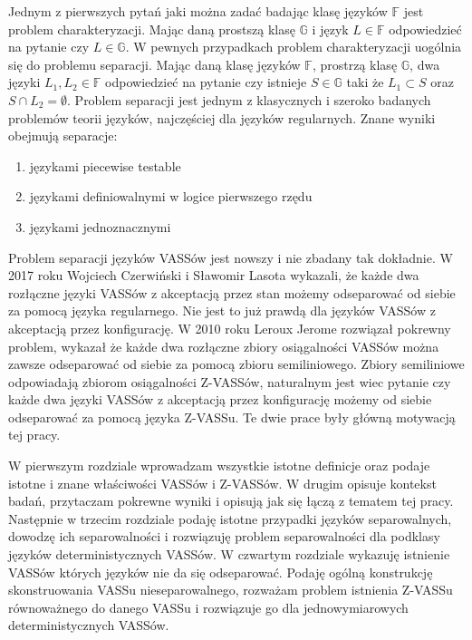     Jednym z pierwszych pytań jaki można zadać badając klasę języków $\mathbb{F}$ jest problem charakteryzacji.
    Mając daną prostszą klasę $\mathbb{G}$ i język $L\in \mathbb{F}$ odpowiedzieć na pytanie czy $L \in \mathbb{G}$.
    W pewnych przypadkach problem charakteryzacji uogólnia się do problemu separacji.
    Mając daną klasę języków $\mathbb{F}$, prostrzą klasę $\mathbb{G}$, dwa języki $L_1,L_2 \in \mathbb{F}$ odpowiedzieć na
    pytanie czy istnieje $S \in \mathbb{G}$ taki że $L_1 \subset S$ oraz $S \cap L_2 = \emptyset$.
    Problem separacji jest jednym z klasycznych i szeroko badanych problemów teorii języków, najczęściej dla języków regularnych.
    Znane wyniki obejmują separacje:
    \begin{enumerate}
        \item  językami piecewise testable\cite{piecewise-testable,piecewise-testable2}
        \item językami definiowalnymi w logice pierwszego rzędu\cite{FO-languages}
        \item  językami jednoznacznymi\cite{piecewise-testable2}
    \end{enumerate}

    Problem separacji języków VASSów jest nowszy i nie zbadany tak dokładnie.
    W 2017 roku Wojciech Czerwiński i Sławomir Lasota wykazali\cite{sep1}, że każde dwa rozłączne języki VASSów z akceptacją przez stan możemy odseparować
    od siebie za pomocą języka regularnego.
    Nie jest to już prawdą dla języków VASSów z akceptacją przez konfigurację.
    W 2010 roku Leroux Jerome\cite{reach_sep_jerome} rozwiązał pokrewny problem, wykazał że każde dwa rozłączne zbiory osiągalności VASSów można zawsze odseparować
    od siebie za pomocą zbioru semiliniowego.
    Zbiory semiliniowe odpowiadają zbiorom osiągalności Z-VASSów, naturalnym jest wiec pytanie czy każde dwa języki VASSów
    z akceptacją przez konfigurację możemy od siebie odseparować za pomocą języka Z-VASSu.
    Te dwie prace były główną motywacją tej pracy.

    W pierwszym rozdziale wprowadzam wszystkie istotne definicje oraz podaje istotne i znane właściwości VASSów i Z-VASSów.
    W drugim opisuje kontekst badań, przytaczam pokrewne wyniki i opisują jak się łączą z tematem tej pracy.
    Następnie w trzecim rozdziale podaję istotne przypadki języków separowalnych, dowodzę ich separowalności i rozwiązuję problem
    separowalności dla podklasy języków deterministycznych VASSów.
    W czwartym rozdziale wykazuję istnienie VASSów których języków nie da się odseparować.
    Podaję ogólną konstrukcję skonstruowania VASSu nieseparowalnego, rozważam problem istnienia Z-VASSu równoważnego do danego VASSu i rozwiązuje go
    dla jednowymiarowych deterministycznych VASSów.


